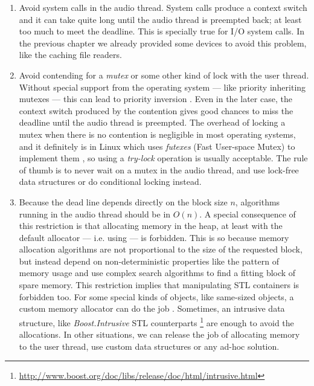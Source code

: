 \begin{enumerate}

\item Avoid system calls in the audio thread. System calls produce a
  context switch and it can take quite long until the audio thread is
  preempted back; at least too much to meet the deadline. This is
  specially true for I/O system calls. In the previous chapter we
  already provided some devices to avoid this problem, like the
  caching file readers.

\item Avoid contending for a \emph{mutex} or some other kind of lock
  with the user thread. Without special support from the operating
  system --- like priority inheriting mutexes --- this can lead to
  priority inversion \cite{kim03basic}. Even in the later case, the
  context switch produced by the contention gives good chances to miss
  the deadline until the audio thread is preempted. The overhead of
  locking a mutex when there is no contention is negligible in most
  operating systems, and it definitely is in Linux which uses
  \emph{futexes} (Fast User-space Mutex) to implement them
  \cite{franke02futex}, so using a \emph{try-lock} operation is
  usually acceptable. The rule of thumb is to never wait on a mutex in
  the audio thread, and use lock-free data structures
  \cite{valois96lockfree} or do conditional locking instead.

\item Because the dead line depends directly on the block size $n$,
  algorithms running in the audio thread should be in $O(n)$. A special
  consequence of this restriction is that allocating memory in the
  heap, at least with the default allocator --- i.e. using 
  --- is forbidden. This is so because memory allocation algorithms
  are not proportional to the size of the requested block, but instead
  depend on non-deterministic properties like the pattern of memory
  usage and use complex search algorithms to find a fitting block of
  spare memory. This restriction implies that manipulating STL
  containers is forbidden too. For some special kinds of objects, like
  same-sized objects, a custom memory allocator can do the job
  \cite{alexandrescu01modern}. Sometimes, an intrusive data structure,
  like \emph{Boost.Intrusive} STL counterparts
  \footnote{\url{http://www.boost.org/doc/libs/release/doc/html/intrusive.html}}
  are enough to avoid the allocations. In other situations, we can
  release the job of allocating memory to the user thread, use custom
  data structures or any ad-hoc solution.
\end{enumerate}

